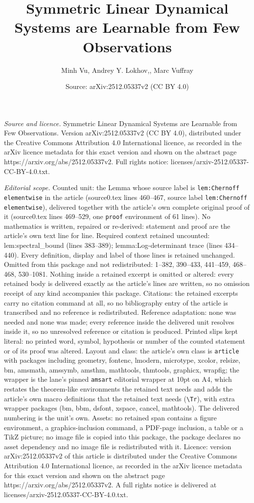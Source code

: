 \documentclass[10pt,a4paper]{amsart}
\title[Symmetric Linear Dynamical Systems are Learnable from Few Ob]{Symmetric Linear Dynamical Systems are Learnable from Few Observations}
\author{Minh Vu, Andrey Y. Lokhov,, Marc Vuffray}
\date{Source: arXiv:2512.05337v2 (CC BY 4.0)}
\begin{document}
\maketitle

\noindent\emph{Source and licence.} Symmetric Linear Dynamical Systems are Learnable from Few Observations. Version arXiv:2512.05337v2 (CC BY 4.0), distributed under the Creative Commons Attribution 4.0 International licence, as recorded in the arXiv licence metadata for this exact version and shown on the abstract page https://arxiv.org/abs/2512.05337v2. Full rights notice: licenses/arxiv-2512.05337-CC-BY-4.0.txt.\par\smallskip

\noindent\textit{Editorial scope.} Counted unit: the Lemma whose source label is \texttt{lem:Chernoff elementwise} in the article (source0.tex lines 460--467, source label \texttt{lem:Chernoff elementwise}), delivered together with the article's own complete original proof of it (source0.tex lines 469--529, one \texttt{proof} environment of 61 lines). No mathematics is written, repaired or re-derived: statement and proof are the article's own text line for line. Required context retained uncounted: lem:spectral\_bound (lines 383--389); lemma:Log-determinant trace (lines 434--440). Every definition, display and label of those lines is retained unchanged. Omitted from this package and not redistributed: 1--382, 390--433, 441--459, 468--468, 530--1081. Nothing inside a retained excerpt is omitted or altered: every retained body is delivered exactly as the article's lines are written, so no omission receipt of any kind accompanies this package. Citations: the retained excerpts carry no citation command at all, so no bibliography entry of the article is transcribed and no reference is redistributed. Reference adaptation: none was needed and none was made; every reference inside the delivered unit resolves inside it, so no unresolved reference or citation is produced. Printed slips kept literal: no printed word, symbol, hypothesis or number of the counted statement or of its proof was altered. Layout and class: the article's own class is \texttt{article} with packages including geometry, fontenc, lmodern, microtype, xcolor, relsize, bm, amsmath, amssymb, amsthm, mathtools, thmtools, graphicx, wrapfig; the wrapper is the lane's pinned \texttt{amsart} editorial wrapper at 10pt on A4, which restates the theorem-like environments the retained text needs and adds the article's own macro definitions that the retained text needs (\texttt{\textbackslash Tr}), with extra wrapper packages (bm, bbm, dsfont, xspace, cancel, mathtools). The delivered numbering is the unit's own. Assets: no retained span contains a figure environment, a graphics-inclusion command, a PDF-page inclusion, a table or a TikZ picture; no image file is copied into this package, the package declares no asset dependency and no image file is redistributed with it. Licence: version arXiv:2512.05337v2 of this article is distributed under the Creative Commons Attribution 4.0 International licence, as recorded in the arXiv licence metadata for this exact version and shown on the abstract page https://arxiv.org/abs/2512.05337v2. A full rights notice is delivered at licenses/arxiv-2512.05337-CC-BY-4.0.txt. 
\end{document}
